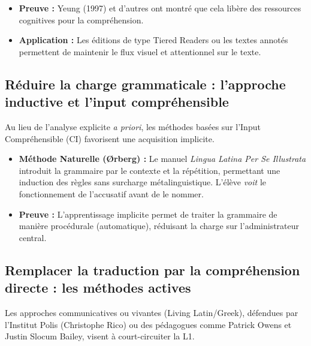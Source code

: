 \begin{itemize}\item \textbf{Preuve :} Yeung (1997) et d'autres ont montré que cela libère des ressources cognitives pour la compréhension.\cite{II-1-3-ref22}\item \textbf{Application :} Les éditions de type \og Tiered Readers\fg{} ou les textes annotés permettent de maintenir le flux visuel et attentionnel sur le texte.\cite{II-1-3-ref42}\end{itemize}

\subsection{Réduire la charge grammaticale : l'approche inductive et l'input compréhensible}

Au lieu de l'analyse explicite \textit{a priori}, les méthodes basées sur l'Input Compréhensible
(CI) favorisent une acquisition implicite.

\begin{itemize}\item \textbf{Méthode Naturelle (Ørberg) :} Le manuel \textit{Lingua Latina Per Se Illustrata} introduit la grammaire par le contexte et la répétition, permettant une induction des règles sans surcharge métalinguistique. L'élève \textit{voit} le fonctionnement de l'accusatif avant de le nommer.\cite{II-1-3-ref44}\item \textbf{Preuve :} L'apprentissage implicite permet de traiter la grammaire de manière procédurale (automatique), réduisant la charge sur l'administrateur central.\cite{II-1-3-ref18}\end{itemize}

\subsection{Remplacer la traduction par la compréhension directe : les méthodes actives}

Les approches communicatives ou \og vivantes\fg{} (Living Latin/Greek), défendues par l'Institut
Polis (Christophe Rico) ou des pédagogues comme Patrick Owens et Justin Slocum Bailey, visent à
court-circuiter la L1.

